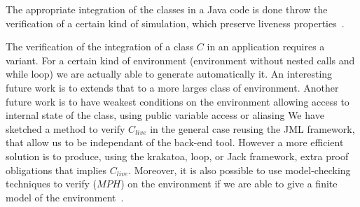 The appropriate integration of the classes in a Java code
is done throw the verification of a certain kind of simulation,
which preserve liveness properties~\cite{bellegarde00}.

The verification of the integration of a class $C$ in
an application %
requires a
variant. For a certain kind of environment (environment without
nested calls and while loop) we are actually able to generate automatically
it. An interesting future work is to extends that to 
a more larges class of environment. 
Another future work is to have weakest conditions
 on the environment allowing access to internal state of the class, 
using public variable access or
aliasing%
We have sketched a method to verify $C_{live}$ in the general case reusing
the JML framework, that allow us to be independant of the back-end tool.
However a more efficient solution is to produce, using the krakatoa, loop,
or Jack framework, extra proof obligations that implies $C_{live}$. 
Moreover, it is also possible to use model-checking techniques to verify
($MPH$) on the environment if we are able to give a finite model
of the environment~\cite{Alur01,Moped03}.


 


